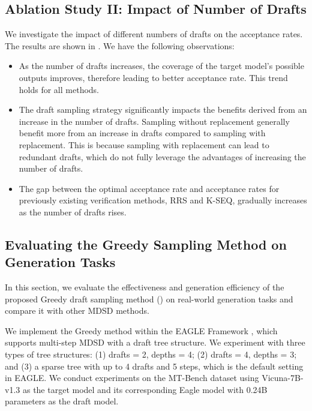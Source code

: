 \documentclass{article}
\makeatletter
\newcommand{\myvspace}{\@ifstar\myvspacestar\myvspacenostar}
\newcommand{\myvspacenostar}[1]{}
\newcommand{\myvspacestar}[1]{}
\newcommand{\crvspace}{\@ifstar\crvspacestar\crvspacenostar}
\newcommand{\crvspacenostar}[1]{}
\newcommand{\crvspacestar}[1]{}
\makeatother
\begin{document}
\subsection{Ablation Study II: Impact of Number of Drafts}
\myvspace{-2pt}
We investigate the impact of different numbers of drafts on the acceptance rates. The results are shown in . We have the following observations: 
\begin{itemize}[leftmargin=*,noitemsep=0mm,topsep=-2pt]
    \item 
As the number of drafts increases, the coverage of the target model's possible outputs improves, therefore leading to better acceptance rate.
This trend holds for all methods.
    \item 
The draft sampling strategy significantly impacts the benefits derived from an increase in the number of drafts.
Sampling without replacement generally benefit more from an increase in drafts compared to sampling with replacement. This is because sampling with replacement can lead to redundant drafts, which do not fully leverage the advantages of increasing the number of drafts.
    \item 
The gap between the optimal acceptance rate and acceptance rates for previously existing verification methods, RRS and K-SEQ, gradually increases as the number of drafts rises.


\end{itemize}

\crvspace{-5pt}
\subsection{Evaluating the Greedy Sampling Method on Generation Tasks}
\crvspace{-5pt}
In this section, we evaluate the effectiveness and generation efficiency of the proposed Greedy draft sampling method () on real-world generation tasks and compare it with other MDSD methods.

We implement the Greedy method within the EAGLE Framework \citep{li2024eagle}, which supports multi-step MDSD with a draft tree structure. We experiment with three types of tree structures: (1) drafts = 2, depths = 4; (2) drafts = 4, depths = 3; and (3) a sparse tree with up to 4 drafts and 5 steps, which is the default setting in EAGLE. We conduct experiments on the MT-Bench dataset \citep{zheng2023judging} using Vicuna-7B-v1.3 \citep{vicuna2023} as the target model and its corresponding Eagle model with 0.24B parameters as the draft model.
\end{document}
